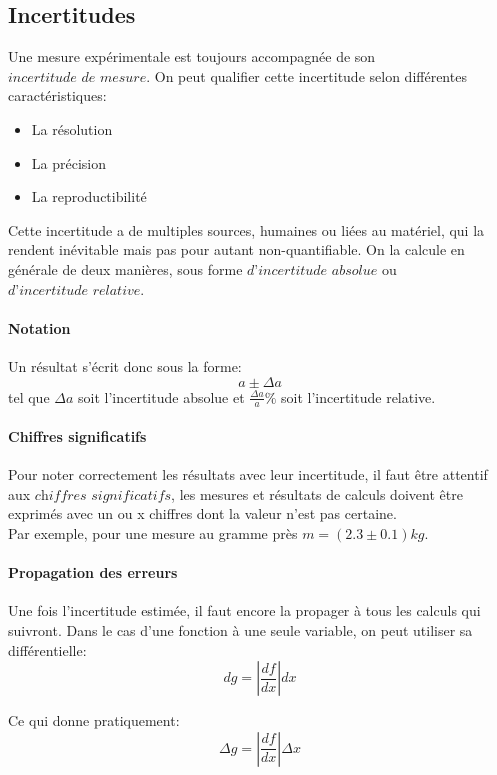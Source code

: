\subsection{Incertitudes}

Une mesure expérimentale est toujours accompagnée de son $\textit{incertitude de mesure}$. On peut qualifier cette incertitude selon différentes caractéristiques:
\begin{itemize}
\item La résolution
\item La précision
\item La reproductibilité
\end{itemize}

Cette incertitude a de multiples sources, humaines ou liées au matériel, qui la rendent inévitable mais pas pour autant non-quantifiable.
On la calcule en générale de deux manières, sous forme $\textit{d'incertitude absolue}$ ou $\textit{d'incertitude relative}$.

\paragraph{Notation}
Un résultat s'écrit donc sous la forme: \[a\pm\Delta a\] tel que $\Delta a$ soit l'incertitude absolue et $\frac{\Delta a}{a} \%$ soit l'incertitude relative.

\paragraph{Chiffres significatifs}
Pour noter correctement les résultats avec leur incertitude, il faut être attentif aux $\textit{chiffres significatifs}$, les mesures et résultats de calculs doivent être exprimés avec un ou x chiffres dont la valeur n'est pas certaine.\\
Par exemple, pour une mesure au gramme près $m = (2.3\pm0.1)kg$.

\paragraph{Propagation des erreurs}
Une fois l'incertitude estimée, il faut encore la propager à tous les calculs qui suivront. Dans le cas d'une fonction à une seule variable, on peut utiliser sa différentielle:
\begin{equation}
    dg=|{\frac{df}{dx}}|dx
\end{equation}

Ce qui donne pratiquement:
\begin{equation}
    \Delta g=|\frac{df}{dx}|\Delta x
\end{equation}

